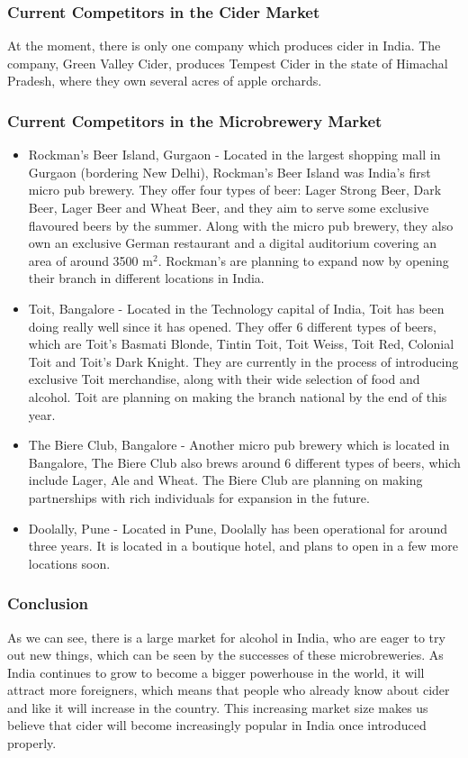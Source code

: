 \documentclass{article}
\begin{document}
\subsubsection{Current Competitors in the Cider Market}
At the moment, there is only one company which produces cider in India.
The company, Green Valley Cider, produces Tempest Cider in the state of Himachal
Pradesh, where they own several acres of apple orchards.

\subsubsection{Current Competitors in the Microbrewery Market}
\begin{itemize}
\item Rockman's Beer Island, Gurgaon - Located in the largest shopping mall in
			 Gurgaon (bordering New Delhi), Rockman's Beer Island was India's first
			 micro pub brewery. They offer four types of beer: Lager Strong Beer, Dark
			 Beer, Lager Beer and Wheat Beer, and they aim to serve some exclusive
 	     flavoured beers by the summer. Along with the micro pub brewery, they also
			 own an exclusive German restaurant and a digital auditorium covering an
	     area of around 3500 m$^2$. Rockman's are planning to expand now by opening
			 their branch in different locations in India.
\item Toit, Bangalore - Located in the Technology capital of India, Toit has been
			 doing really well since it has opened. They offer 6 different types of beers,
			 which are Toit's Basmati Blonde, Tintin Toit, Toit Weiss, Toit Red, Colonial
			 Toit and Toit's Dark Knight. They are currently in the process of introducing
			 exclusive Toit merchandise, along with their wide selection of food and alcohol.
			 Toit are planning on making the branch national by the end of this year.
\item The Biere Club, Bangalore - Another micro pub brewery which is located in
			 Bangalore, The Biere Club also brews around 6 different types of beers, which
			 include Lager, Ale and Wheat. The Biere Club are planning on making
			 partnerships with rich individuals for expansion in the future.
\item Doolally, Pune - Located in Pune, Doolally has been operational for around
			 three years. It is located in a boutique hotel, and plans to open in a few more
			 locations soon.
\end{itemize}

\subsubsection{Conclusion}
As we can see, there is a large market for alcohol in India, who are eager to try
out new things, which can be seen by the successes of these microbreweries. As India
continues to grow to become a bigger powerhouse in the world, it will attract more
foreigners, which means that people who already know about cider and like it
will increase in the country. This increasing market size makes us believe that
cider will become increasingly popular in India once introduced properly.
\end{document}
